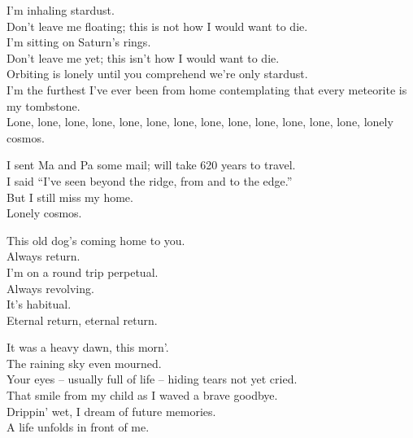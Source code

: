 
I'm inhaling stardust. \\
Don't leave me floating; this is not how I would want to die. \\
I'm sitting on Saturn's rings. \\
Don't leave me yet; this isn't how I would want to die. \\
Orbiting is lonely until you comprehend we're only stardust. \\
I'm the furthest I've ever been from home contemplating that every meteorite is my tombstone. \\
Lone, lone, lone, lone, lone, lone, lone, lone, lone, lone, lone, lone, lone, lonely cosmos. \\


I sent Ma and Pa some mail; will take 620 years to travel. \\
I said ``I've seen beyond the ridge, from  and to the edge.'' \\
But I still miss my home. \\
Lonely cosmos. \\





This old dog's coming home to you. \\
Always return. \\
I'm on a round trip perpetual. \\
Always revolving. \\
It's habitual. \\
Eternal return, eternal return. \\


It was a heavy dawn, this morn'. \\
The raining sky even mourned. \\
Your eyes -- usually full of life -- hiding tears not yet cried. \\
That smile from my child as I waved a brave goodbye. \\
Drippin' wet, I dream of future memories. \\
A life unfolds in front of me. \\

